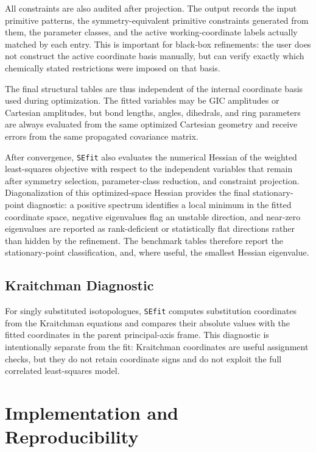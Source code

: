 \documentclass[journal=jctcce,manuscript=article,maxauthors=999]{achemso}
\begin{document}
All constraints are also audited after projection. The output records the input
primitive patterns, the symmetry-equivalent primitive constraints generated from
them, the parameter classes, and the active working-coordinate labels actually
matched by each entry. This is important for black-box refinements: the user
does not construct the active coordinate basis manually, but can verify exactly
which chemically stated restrictions were imposed on that basis.

The final structural tables are thus independent of the internal coordinate
basis used during optimization. The fitted variables may be GIC amplitudes or
Cartesian amplitudes, but bond lengths, angles, dihedrals, and ring parameters
are always evaluated from the same optimized Cartesian geometry and receive
errors from the same propagated covariance matrix.

After convergence, \texttt{SEfit} also evaluates the numerical Hessian of the
weighted least-squares objective with respect to the independent variables that
remain after symmetry selection, parameter-class reduction, and constraint
projection. Diagonalization of this optimized-space Hessian provides the final
stationary-point diagnostic: a positive spectrum identifies a local minimum in
the fitted coordinate space, negative eigenvalues flag an unstable direction,
and near-zero eigenvalues are reported as rank-deficient or statistically flat
directions rather than hidden by the refinement. The benchmark tables therefore
report the stationary-point classification, and, where useful, the smallest
Hessian eigenvalue.


\subsection{Kraitchman Diagnostic}

For singly substituted isotopologues, \texttt{SEfit} computes substitution
coordinates from the Kraitchman equations\cite{Kraitchman1953} and compares
their absolute values with the fitted coordinates in the parent principal-axis
frame. This diagnostic is intentionally separate from the fit: Kraitchman
coordinates are useful assignment checks, but they do not retain coordinate
signs and do not exploit the full correlated least-squares model.


\section{Implementation and Reproducibility}
\end{document}
